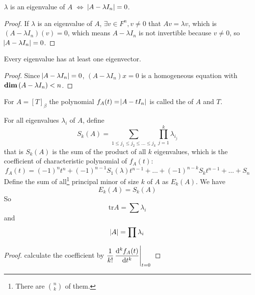 \begin{theorem}
    $\lambda$ is an eigenvalue of $A$ $\iff$ $\abs{A - \lambda I_n} = 0$.
\end{theorem}

\begin{proof}
    If $\lambda$ is an eigenvalue of $A$, $\exists v \in F^n, v \neq 0$ that $A v = \lambda v$, which is $(A - \lambda I_n)(v)= 0$, which means $A - \lambda I_n$ is not invertible because $v \neq 0$, so $\abs{A - \lambda I_n} = 0$.
\end{proof}

\begin{theorem}
    Every eigenvalue has at least one eigenvector.    
\end{theorem}
\begin{proof}
    Since $\abs{A - \lambda I_n} = 0$, $(A - \lambda I_n) x = 0$ is a homogeneous equation with $\displaystyle \mathbf{dim}\left( A - \lambda I_n \right) < n$.
\end{proof}



\begin{definition}
    For $A = [T]_\beta$ the polynomial $f_A(t) = \abs{A - t I_n}$ is called the  of $A$ and $T$. 
\end{definition}

\begin{theorem}
    For all eigenvalues $\lambda_i$ of $A$, define 
    \begin{equation}
        S_k(A) = \sum_{1\leq j_1 \leq j_2 \leq \dots \leq j_k} \prod_{j=1}^k \lambda_{i_j}
    \end{equation}
    that is $S_k(A)$ is the sum of the product of all $k$ eigenvalues, which is the coefficient of characteristic polynomial of $f_A(t)$:
    \begin{equation}
        f_A(t) = (-1)^n t^n + (-1)^{n-1} S_{1}(\lambda)t^{n-1} + \dots + (-1)^{n-k} S_{k} t^{n-1} + \dots + S_{n}
    \end{equation}
    Define the sum of all\footnote{There are $\binom{n}{k}$ of them.} principal minor of size $k$ of $A$ as $E_k(A)$. We have
    \begin{equation}
        E_k(A) = S_k(A)
    \end{equation}
    So 
    \begin{equation}
        \text{tr} A = \sum \lambda_i
    \end{equation}
    and 
    \begin{equation}
        \abs{A} = \prod \lambda_i
    \end{equation}
\end{theorem}
\begin{proof}
    calculate the coefficient by $\displaystyle \frac{1}{k!} \eval{\dod[k]{f_A(t)}{t}}_{t = 0}$
\end{proof}



